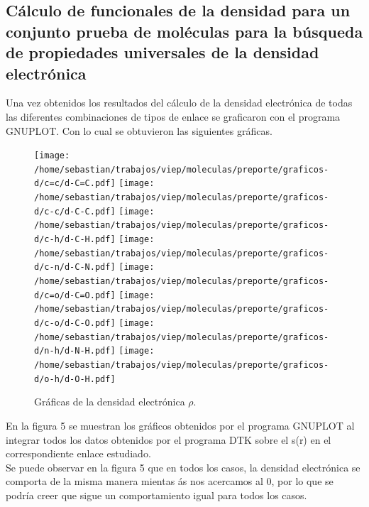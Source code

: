 \documentclass[12pt,letterpaper]{article}
\begin{document}
\subsection{Cálculo de funcionales de la densidad para un conjunto prueba de moléculas para la búsqueda de propiedades universales de la densidad electrónica}
Una vez obtenidos los resultados del cálculo de la densidad electrónica de todas las diferentes combinaciones de tipos de enlace se graficaron con el programa GNUPLOT. Con lo cual se obtuvieron las siguientes gráficas.\\
\begin{figure}[H]
\begin{center}
\texttt{[image: /home/sebastian/trabajos/viep/moleculas/preporte/graficos-d/c=c/d-C=C.pdf]}
\texttt{[image: /home/sebastian/trabajos/viep/moleculas/preporte/graficos-d/c-c/d-C-C.pdf]}
\texttt{[image: /home/sebastian/trabajos/viep/moleculas/preporte/graficos-d/c-h/d-C-H.pdf]}
\texttt{[image: /home/sebastian/trabajos/viep/moleculas/preporte/graficos-d/c-n/d-C-N.pdf]}
\texttt{[image: /home/sebastian/trabajos/viep/moleculas/preporte/graficos-d/c=o/d-C=O.pdf]}
\texttt{[image: /home/sebastian/trabajos/viep/moleculas/preporte/graficos-d/c-o/d-C-O.pdf]}
\texttt{[image: /home/sebastian/trabajos/viep/moleculas/preporte/graficos-d/n-h/d-N-H.pdf]}
\texttt{[image: /home/sebastian/trabajos/viep/moleculas/preporte/graficos-d/o-h/d-O-H.pdf]}
\end{center}
\caption{Gráficas de la densidad electrónica $\rho$.}
\end{figure}

En la figura 5 se muestran los gráficos obtenidos por el programa GNUPLOT al integrar todos los datos obtenidos por el programa DTK sobre el s(r) en el correspondiente enlace estudiado.\\
Se puede observar en la figura 5 que en todos los casos, la densidad electrónica se comporta de la misma manera mientas ás nos acercamos al 0, por lo que se podría creer que sigue un comportamiento igual para todos los casos.\\
\end{document}
